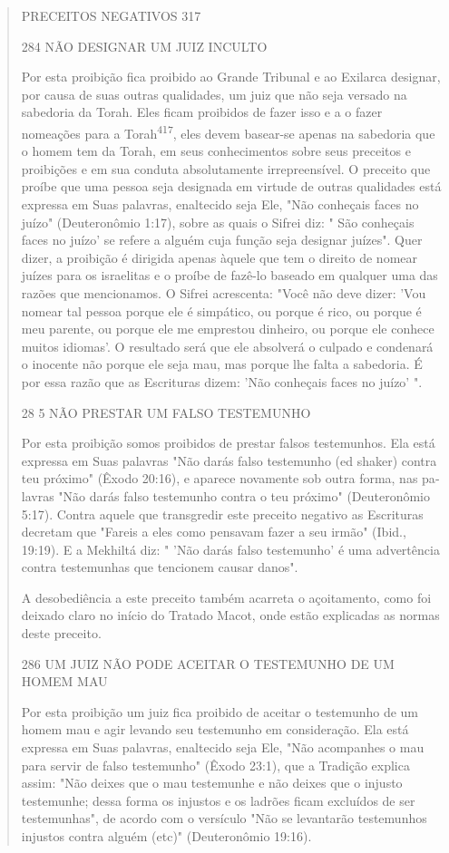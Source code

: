 \begin{quote}
PRECEITOS NEGATIVOS 317

284 NÃO DESIGNAR UM JUIZ INCULTO

Por esta proibição fica proibido ao Grande Tribunal e ao Exilarca
designar, por causa de suas outras qualidades, um juiz que não seja
versado na sabedoria da Torah. Eles ficam proibidos de fazer isso e a o
fazer nomeações para a Torah\textsuperscript{417}, eles devem basear-se
apenas na sabedoria que o homem tem da Torah, em seus conhecimentos
sobre seus preceitos e proibições e em sua conduta absolutamente
irrepreensível. O preceito que proíbe que uma pessoa seja designada em
virtude de outras qualidades está expressa em Suas palavras, enaltecido
seja Ele, "Não conheçais faces no juízo" (Deuteronômio 1:17), so­bre as
quais o Sifrei diz: " São conheçais faces no juízo' se refere a alguém
cuja função seja designar juízes". Quer dizer, a proibição é dirigida
apenas àquele que tem o direito de nomear juízes para os israelitas e o
proíbe de fazê-lo basea­do em qualquer uma das razões que mencionamos. O
Sifrei acrescenta: "Você não deve dizer: 'Vou nomear tal pessoa porque
ele é simpático, ou porque é rico, ou porque é meu parente, ou porque
ele me emprestou dinheiro, ou por­que ele conhece muitos idiomas'. O
resultado será que ele absolverá o culpado e condenará o inocente não
porque ele seja mau, mas porque lhe falta a sabe­doria. É por essa razão
que as Escrituras dizem: 'Não conheçais faces no juízo' ".

28 5 NÃO PRESTAR UM FALSO TESTEMUNHO

Por esta proibição somos proibidos de prestar falsos testemunhos. Ela
está expressa em Suas palavras "Não darás falso testemunho (ed shaker)
con­tra teu próximo" (Êxodo 20:16), e aparece novamente sob outra forma,
nas pa­lavras "Não darás falso testemunho contra o teu próximo"
(Deuteronômio 5:17). Contra aquele que transgredir este preceito
negativo as Escrituras decretam que "Fareis a eles como pensavam fazer a
seu irmão" (Ibid., 19:19). E a Mekhiltá diz: " 'Não darás falso
testemunho' é uma advertência contra testemunhas que tencionem causar
danos".

A desobediência a este preceito também acarreta o açoitamento, co­mo foi
deixado claro no início do Tratado Macot, onde estão explicadas as
nor­mas deste preceito.

286 UM JUIZ NÃO PODE ACEITAR O TESTEMUNHO DE UM HOMEM MAU

Por esta proibição um juiz fica proibido de aceitar o testemunho de um
homem mau e agir levando seu testemunho em consideração. Ela está
expressa em Suas palavras, enaltecido seja Ele, "Não acompanhes o mau
para servir de fal­so testemunho" (Êxodo 23:1), que a Tradição explica
assim: "Não deixes que o mau testemunhe e não deixes que o injusto
testemunhe; dessa forma os injustos e os ladrões ficam excluídos de ser
testemunhas", de acordo com o versículo "Não se levantarão testemunhos
injustos contra alguém (etc)" (Deuteronômio 19:16).
\end{quote}

